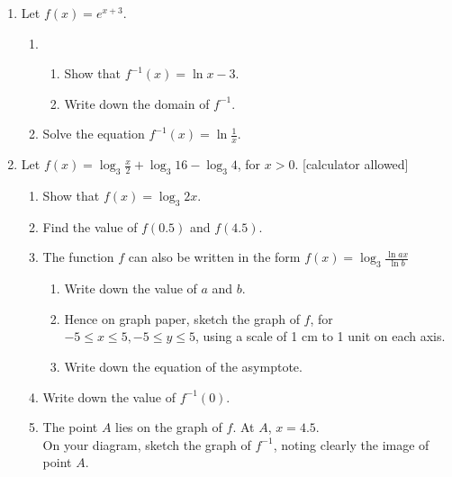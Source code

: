 \documentclass[12pt, oneside]{article}
\begin{document}
\begin{enumerate}
\item Let $f(x)= e^{x+3}$.
\begin{enumerate}
    \item
    \begin{enumerate}
    \item Show that $f^{-1}(x) = \ln x - 3$.
        \begin{flushright}[3]\end{flushright}
    \item Write down the domain of $f^{-1}$.
    \end{enumerate}
    \item Solve the equation $f^{-1}(x) = \ln \frac{1}{x}$.
        \begin{flushright}[4]\end{flushright}
\end{enumerate}

\item Let $f(x)= \log_3 \frac{x}{2}+ \log_3 16 - \log_3 4$, for $x>0$.
[calculator allowed]
\begin{enumerate}
    \item Show that $f(x)= \log_3 2x$.
        \begin{flushright}[2]\end{flushright}
    \item Find the value of $f(0.5)$ and $f(4.5)$.
        \begin{flushright}[3]\end{flushright}
    \item The function $f$ can also be written in the form $f(x)= \log_3 \frac{\ln ax}{\ln b}$
    \begin{enumerate}
    \item Write down the value of $a$ and $b$.
    \item Hence on graph paper, sketch the graph of $f$, for $-5 \leq x \leq 5, -5 \leq y \leq 5$, using a scale of 1 cm to 1 unit on each axis.
    \item Write down the equation of the asymptote.
        \begin{flushright}[6]\end{flushright}
    \end{enumerate}
    \item Write down the value of $f^{-1}(0)$.
        \begin{flushright}[1]\end{flushright}
    \item The point $A$ lies on the graph of $f$. At $A$, $x=4.5$.\\
        On your diagram, sketch the graph of $f^{-1}$, noting clearly the image of point $A$.
        \begin{flushright}[4]\end{flushright}
\end{enumerate}


\end{enumerate}
\end{document}

